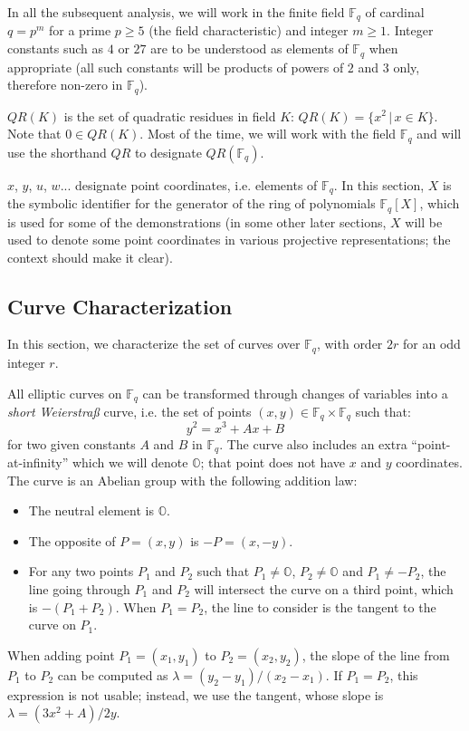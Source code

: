 \documentclass{llncs}
\newcommand{\QR}{QR}
\newcommand{\bF}{\mathbb{F}}
\newcommand{\neutral}{\mathbb{O}}
\begin{document}
In all the subsequent analysis, we will work in the finite field $\bF_q$
of cardinal $q = p^m$ for a prime $p \geq 5$ (the field characteristic)
and integer $m\geq 1$. Integer constants such as $4$ or $27$ are to be
understood as elements of $\bF_q$ when appropriate (all such constants
will be products of powers of $2$ and $3$ only, therefore non-zero in
$\bF_q$).

$\QR(K)$ is the set of quadratic residues in field $K$: $\QR(K) = \{ x^2
\,|\, x \in K \} $. Note that $0 \in \QR(K)$. Most of the time, we will
work with the field $\bF_q$ and will use the shorthand $QR$ to designate
$QR(\bF_q)$.

$x$, $y$, $u$, $w$... designate point coordinates, i.e. elements of
$\bF_q$. In this section, $X$ is the symbolic identifier for the
generator of the ring of polynomials $\bF_q[X]$, which is used for some
of the demonstrations (in some other later sections, $X$ will be used
to denote some point coordinates in various projective representations;
the context should make it clear).

\subsection{Curve Characterization}\label{sec:structure:characterization}

In this section, we characterize the set of curves over $\bF_q$, with
order $2r$ for an odd integer $r$.

All elliptic curves on $\bF_q$ can be transformed through changes of
variables into a \emph{short Weierstraß} curve, i.e. the set of points
$(x, y) \in \bF_q\times\bF_q$ such that:
    $$ y^2 = x^3 + Ax + B $$
for two given constants $A$ and $B$ in $\bF_q$. The curve also includes
an extra ``point-at-infinity'' which we will denote $\neutral$; that
point does not have $x$ and $y$ coordinates. The curve is an Abelian
group with the following addition law:
\begin{itemize}

    \item The neutral element is $\neutral$.

    \item The opposite of $P = (x, y)$ is $-P = (x, -y)$.

    \item For any two points $P_1$ and $P_2$ such that $P_1 \neq
    \neutral$, $P_2 \neq \neutral$ and $P_1 \neq -P_2$, the line going
    through $P_1$ and $P_2$ will intersect the curve on a third point,
    which is $-(P_1+P_2)$. When $P_1 = P_2$, the line to consider is
    the tangent to the curve on $P_1$.

\end{itemize}
When adding point $P_1 = (x_1, y_1)$ to $P_2 = (x_2, y_2)$, the slope of
the line from $P_1$ to $P_2$ can be computed as $\lambda = (y_2 - y_1) /
(x_2 - x_1)$. If $P_1 = P_2$, this expression is not usable; instead, we
use the tangent, whose slope is $\lambda = (3x^2 + A) / 2y$.
\end{document}
